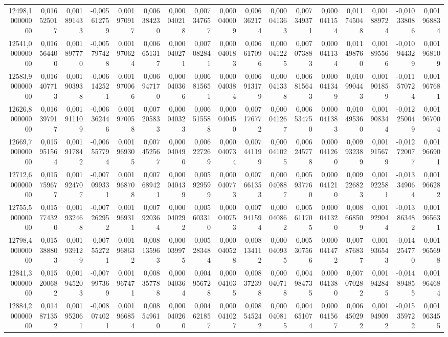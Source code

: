 \begin{longtable}{rrrrrrrrrrrrrrrrr}
12498,100000000 & 0,016525017 & 0,001891433 & -0,005612759 & 0,001970917 & 0,006384230 & 0,000040218 & 0,007347657 & 0,000040009 & 0,006362174 & 0,000041363 & 0,007349371 & 0,000041154 & 0,011745048 & 0,001889724 & -0,010338086 & 0,001968834\\
12541,000000000 & 0,016564400 & 0,001897770 & -0,005797428 & 0,001970624 & 0,006651317 & 0,000040271 & 0,007082841 & 0,000040183 & 0,006617096 & 0,000041225 & 0,007073883 & 0,000041134 & 0,011498760 & 0,001895566 & -0,010944329 & 0,001968109\\
12583,900000000 & 0,016407713 & 0,001903938 & -0,006142521 & 0,001970066 & 0,006947170 & 0,000040366 & 0,006815651 & 0,000040384 & 0,006913179 & 0,000041338 & 0,006815643 & 0,000041349 & 0,010990443 & 0,001901859 & -0,011570724 & 0,001967681\\
12626,800000000 & 0,016397917 & 0,001911109 & -0,006362446 & 0,001970058 & 0,007205833 & 0,000040323 & 0,006515588 & 0,000040450 & 0,007176772 & 0,000041267 & 0,006534750 & 0,000041383 & 0,010495360 & 0,001908344 & -0,012250049 & 0,001967004\\
12669,700000000 & 0,015951564 & 0,001917842 & -0,006557794 & 0,001969305 & 0,007452567 & 0,000040490 & 0,006227269 & 0,000040734 & 0,007441199 & 0,000041025 & 0,006245778 & 0,000041260 & 0,009932389 & 0,001915679 & -0,012720077 & 0,001966901\\
12712,600000000 & 0,015759677 & 0,001924707 & -0,007099331 & 0,001968708 & 0,007689421 & 0,000040439 & 0,005929599 & 0,000040773 & 0,007661353 & 0,000040887 & 0,005937760 & 0,000041210 & 0,009226823 & 0,001922581 & -0,013349064 & 0,001966282\\
12755,500000000 & 0,015774320 & 0,001932468 & -0,007262952 & 0,001969311 & 0,007920364 & 0,000040292 & 0,005603310 & 0,000040753 & 0,007941594 & 0,000040862 & 0,005611705 & 0,000041320 & 0,008668509 & 0,001929044 & -0,013863482 & 0,001965631\\
12798,400000000 & 0,015388803 & 0,001939129 & -0,007552721 & 0,001968632 & 0,008135963 & 0,000039975 & 0,005283484 & 0,000040528 & 0,008134112 & 0,000040935 & 0,005307566 & 0,000041472 & 0,007876837 & 0,001936543 & -0,014254770 & 0,001965698\\
12841,300000000 & 0,015200682 & 0,001945203 & -0,007997369 & 0,001967471 & 0,008357788 & 0,000040364 & 0,004956728 & 0,000041035 & 0,008372398 & 0,000040718 & 0,004984735 & 0,000041380 & 0,007070282 & 0,001942845 & -0,014894855 & 0,001964684\\
12884,200000000 & 0,014871352 & 0,001952061 & -0,008074021 & 0,001966854 & 0,008549610 & 0,000040260 & 0,004621857 & 0,000041027 & 0,008545242 & 0,000040815 & 0,004651074 & 0,000041567 & 0,006450292 & 0,001949092 & -0,015359722 & 0,001963455\\

\end{longtable}
